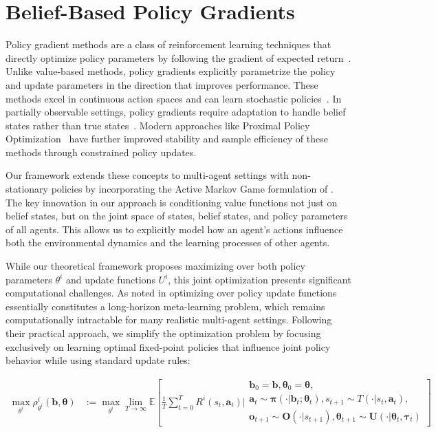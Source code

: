 \documentclass[a4paper,12pt]{report}
\begin{document}
\section{Belief-Based Policy Gradients}
Policy gradient methods are a class of reinforcement learning techniques that directly optimize policy parameters by following the gradient of expected return~\cite{sutton1999policy}. Unlike value-based methods, policy gradients explicitly parametrize the policy and update parameters in the direction that improves performance. These methods excel in continuous action spaces and can learn stochastic policies~\cite{williams1992simple}. In partially observable settings, policy gradients require adaptation to handle belief states rather than true states~\cite{kaelbling1998planning}. Modern approaches like Proximal Policy Optimization~\cite{schulman2017proximal} have further improved stability and sample efficiency of these methods through constrained policy updates.

Our framework extends these concepts to multi-agent settings with non-stationary policies by incorporating the Active Markov Game formulation of \citet{kim2022influencing}. The key innovation in our approach is conditioning value functions not just on belief states, but on the joint space of states, belief states, and policy parameters of all agents. This allows us to explicitly model how an agent's actions influence both the environmental dynamics and the learning processes of other agents.

While our theoretical framework proposes maximizing over both policy parameters $\theta^i$ and update functions $U^i$, this joint optimization presents significant computational challenges. As noted in \citet{kim2022influencing} optimizing over policy update functions essentially constitutes a long-horizon meta-learning problem, which remains computationally intractable for many realistic multi-agent settings. Following their practical approach, we simplify the optimization problem by focusing exclusively on learning optimal fixed-point policies that influence joint policy behavior while using standard update rules:

\begin{align}
    \max_{\theta^i} \rho^i_{\theta^i}(\boldsymbol{b}, \boldsymbol{\theta}) & := \max_{\theta^i} \lim_{T \to \infty} \mathbb{E}\left[ \frac{1}{T}\sum_{t=0}^T R^i(s_t, \boldsymbol{a}_t) \bigg|
        \begin{array}{c}
            \boldsymbol{b}_0= \boldsymbol{b}, \boldsymbol{\theta}_0= \boldsymbol{\theta}, \\
            \boldsymbol{a}_t \sim \boldsymbol{\pi}(\cdot|\boldsymbol{b}_t; \boldsymbol{\theta}_t),
            s_{t+1} \sim T(\cdot|s_t, \boldsymbol{a}_t),                                  \\
            \boldsymbol{o}_{t+1} \sim \boldsymbol{O}(\cdot|s_{t+1}),
            \boldsymbol{\theta}_{t+1} \sim \boldsymbol{U}(\cdot|\boldsymbol{\theta}_t, \boldsymbol{\tau}_t)
        \end{array}
        \right]
\end{align}
\end{document}
